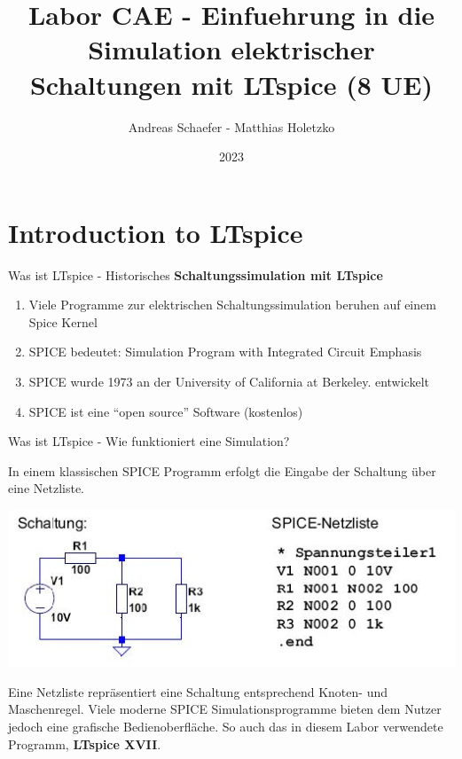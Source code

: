 \documentclass{beamer}
\title{Labor CAE - Einfuehrung in die Simulation elektrischer
Schaltungen mit LTspice (8 UE)}
\date{2023}
\author{Andreas Schaefer - Matthias Holetzko}
\institute{Duale Hochschule Baden-Württemberg  \newline -- \newline Fakultät Technik \newline Studiengang Mechatronik}
\begin{document}
\maketitle
\section{Introduction to LTspice}

\begin{frame}{Was ist LTspice - Historisches}
  \textbf{Schaltungssimulation mit LTspice}\newline
  \begin{enumerate}
    \item Viele Programme zur elektrischen Schaltungssimulation beruhen auf einem Spice Kernel
    \item SPICE bedeutet: Simulation Program with Integrated Circuit Emphasis
    \item SPICE wurde 1973 an der University of California at Berkeley. entwickelt
    \item SPICE ist eine “open source” Software (kostenlos)
  \end{enumerate}
\end{frame}

\begin{frame}[fragile]{Was ist LTspice - Wie funktioniert eine Simulation?}

  In einem klassischen SPICE Programm erfolgt die Eingabe der Schaltung über eine
  Netzliste.
  \begin{center}
    \includegraphics[scale=0.5]{pictures/page1.jpg}
  \end{center}

  Eine Netzliste repräsentiert eine Schaltung entsprechend Knoten- und Maschenregel. \newline Viele moderne SPICE Simulationsprogramme
  bieten dem Nutzer jedoch eine grafische Bedienoberfläche.
  So auch das in diesem Labor verwendete Programm, \textbf{LTspice XVII}.


\end{frame}
\end{document}

